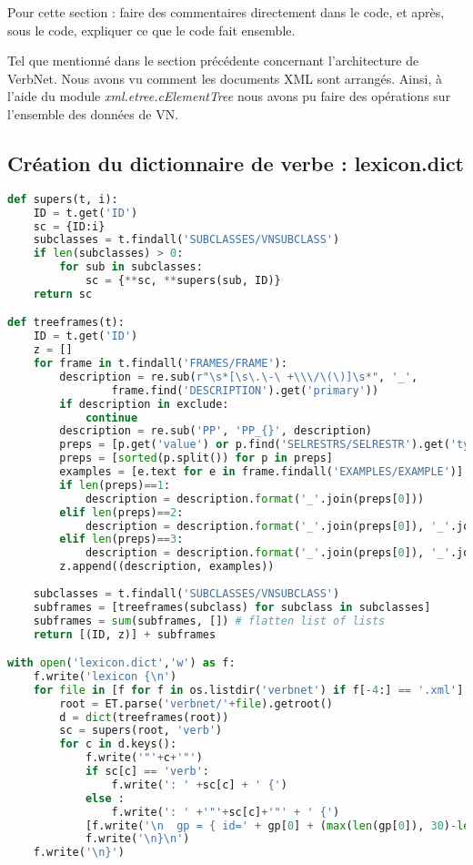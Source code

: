 Pour cette section : faire des commentaires directement dans le code, et après, sous le code, expliquer ce que le code fait ensemble.

Tel que mentionné dans le section précédente concernant l'architecture de VerbNet. Nous avons vu comment les documents XML sont  arrangés. Ainsi, à l'aide du module \emph{xml.etree.cElementTree} nous avons pu faire des opérations sur l'ensemble des données de VN.

\subsection{Création du dictionnaire de verbe : lexicon.dict}
\begin{lstlisting}[language=Python, caption = code pour lexicon.dict]
def supers(t, i):
    ID = t.get('ID')
    sc = {ID:i}
    subclasses = t.findall('SUBCLASSES/VNSUBCLASS')
    if len(subclasses) > 0:
        for sub in subclasses:
            sc = {**sc, **supers(sub, ID)}
    return sc

def treeframes(t):
    ID = t.get('ID')
    z = []
    for frame in t.findall('FRAMES/FRAME'):
        description = re.sub(r"\s*[\s\.\-\ +\\\/\(\)]\s*", '_', 
				frame.find('DESCRIPTION').get('primary'))
        if description in exclude:
            continue
        description = re.sub('PP', 'PP_{}', description)
        preps = [p.get('value') or p.find('SELRESTRS/SELRESTR').get('type').upper() for p in frame.findall('SYNTAX/PREP')+frame.findall('SYNTAX/LEX')]
        preps = [sorted(p.split()) for p in preps]     
        examples = [e.text for e in frame.findall('EXAMPLES/EXAMPLE')]
        if len(preps)==1:
            description = description.format('_'.join(preps[0]))
        elif len(preps)==2:
            description = description.format('_'.join(preps[0]), '_'.join(preps[1]))
        elif len(preps)==3:
            description = description.format('_'.join(preps[0]), '_'.join(preps[1]), '_'.join(preps[2]))
        z.append((description, examples))
        
    subclasses = t.findall('SUBCLASSES/VNSUBCLASS')
    subframes = [treeframes(subclass) for subclass in subclasses]
    subframes = sum(subframes, []) # flatten list of lists
    return [(ID, z)] + subframes

with open('lexicon.dict','w') as f:
    f.write('lexicon {\n')
    for file in [f for f in os.listdir('verbnet') if f[-4:] == '.xml']:
        root = ET.parse('verbnet/'+file).getroot()       
        d = dict(treeframes(root))
        sc = supers(root, 'verb')
        for c in d.keys():
            f.write('"'+c+'"')
            if sc[c] == 'verb':
                f.write(': ' +sc[c] + ' {')
            else :
                f.write(': ' +'"'+sc[c]+'"' + ' {')
            [f.write('\n  gp = { id=' + gp[0] + (max(len(gp[0]), 30)-len(gp[0]))*' ' + ' dia=x } // ' + ' '.join(gp[1])) for gp in d[c]]
            f.write('\n}\n')
    f.write('\n}')
\end{lstlisting}

